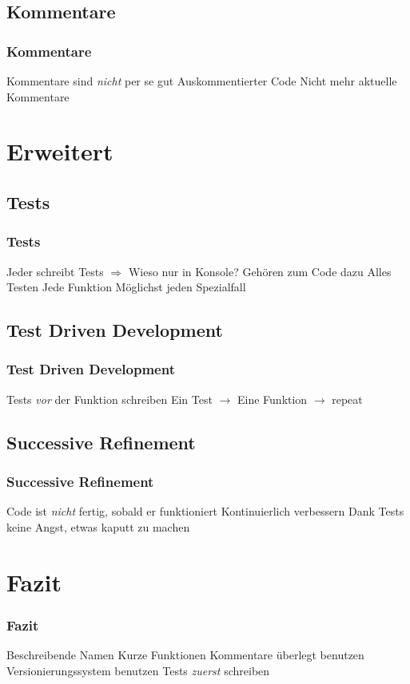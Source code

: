 \documentclass{beamer}
\begin{document}
\subsection{Kommentare}
\begin{frame}
    \frametitle{Kommentare}
    \begin{outline}
        \1 Kommentare sind \emph{nicht} per se gut
        \1 Auskommentierter Code
        \1 Nicht mehr aktuelle Kommentare
    \end{outline}
\end{frame}

\section{Erweitert}
\subsection{Tests}
\begin{frame}
    \frametitle{Tests}
    \begin{outline}
        \1 Jeder schreibt Tests 
        \1[] $\Rightarrow$  Wieso nur in Konsole?
        \1 Gehören zum Code dazu
        \1 Alles Testen
            \2 Jede Funktion
            \2 Möglichst jeden Spezialfall
    \end{outline}
\end{frame}
\subsection{Test Driven Development}
\begin{frame}
    \frametitle{Test Driven Development}
    \begin{outline}
        \1 Tests \emph{vor} der Funktion schreiben
        \1 Ein Test $\rightarrow$ Eine Funktion $\rightarrow$ repeat
    \end{outline}
\end{frame}
\subsection{Successive Refinement}
\begin{frame}
    \frametitle{Successive Refinement}
    \begin{outline}
        \1 Code ist \emph{nicht} fertig, sobald er funktioniert
        \1 Kontinuierlich verbessern
        \1 Dank Tests keine Angst, etwas kaputt zu machen
    \end{outline}
\end{frame}

\section{Fazit}
\begin{frame}
    \frametitle{Fazit}
    \begin{outline}
        \1 Beschreibende Namen
        \1 Kurze Funktionen
        \1 Kommentare überlegt benutzen
        \1 Versionierungssystem benutzen
        \1 Tests \emph{zuerst} schreiben
    \end{outline}
\end{frame}
\end{document}

